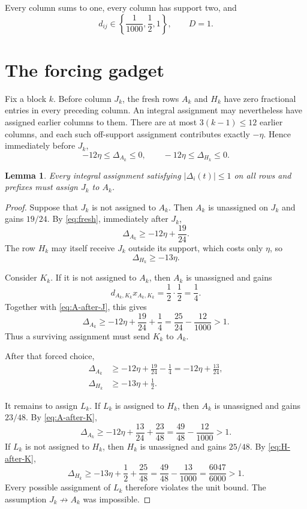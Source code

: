 \documentclass[11pt]{article}
\newtheorem{lemma}[theorem]{Lemma}
\theoremstyle{definition}
\newcommand{\disc}{\Delta}
\begin{document}
Every column sums to one, every column has support two, and
\[
 d_{ij}\in\left\{\frac1{1000},\frac12,1\right\},
 \qquad D=1.
\]

\section{The forcing gadget}

Fix a block $k$.  Before column $J_k$, the fresh rows $A_k$ and $H_k$ have
zero fractional entries in every preceding column.  An integral assignment
may nevertheless have assigned earlier columns to them.  There are at most
$3(k-1)\le12$ earlier columns, and each such off-support assignment contributes
exactly $-\eta$.  Hence immediately before $J_k$,
\begin{equation}\label{eq:fresh}
 -12\eta\le\disc_{A_k}\le0,
 \qquad
 -12\eta\le\disc_{H_k}\le0.
\end{equation}

\begin{lemma}\label{lem:force}
Every integral assignment satisfying $|\disc_i(t)|\le1$ on all rows and
prefixes must assign $J_k$ to $A_k$.
\end{lemma}

\begin{proof}
Suppose that $J_k$ is not assigned to $A_k$.  Then $A_k$ is unassigned on
$J_k$ and gains $19/24$.  By \eqref{eq:fresh}, immediately after $J_k$,
\begin{equation}\label{eq:A-after-J}
 \disc_{A_k}\ge-12\eta+\frac{19}{24}.
\end{equation}
The row $H_k$ may itself receive $J_k$ outside its support, which costs only
$\eta$, so
\begin{equation}\label{eq:H-after-J}
 \disc_{H_k}\ge-13\eta.
\end{equation}

Consider $K_k$.  If it is not assigned to $A_k$, then $A_k$ is unassigned
and gains
\[
 d_{A_k,K_k}x_{A_k,K_k}=\frac12\cdot\frac12=\frac14.
\]
Together with \eqref{eq:A-after-J}, this gives
\[
 \disc_{A_k}\ge-12\eta+\frac{19}{24}+\frac14
 =\frac{25}{24}-\frac{12}{1000}>1.
\]
Thus a surviving assignment must send $K_k$ to $A_k$.

After that forced choice,
\begin{align}
 \disc_{A_k}&\ge-12\eta+\frac{19}{24}-\frac14
             =-12\eta+\frac{13}{24},\label{eq:A-after-K}\\
 \disc_{H_k}&\ge-13\eta+\frac12.\label{eq:H-after-K}
\end{align}

It remains to assign $L_k$.  If $L_k$ is assigned to $H_k$, then $A_k$ is
unassigned and gains $23/48$.  By \eqref{eq:A-after-K},
\[
 \disc_{A_k}\ge-12\eta+\frac{13}{24}+\frac{23}{48}
 =\frac{49}{48}-\frac{12}{1000}>1.
\]
If $L_k$ is not assigned to $H_k$, then $H_k$ is unassigned and gains
$25/48$.  By \eqref{eq:H-after-K},
\[
 \disc_{H_k}\ge-13\eta+\frac12+\frac{25}{48}
 =\frac{49}{48}-\frac{13}{1000}
 =\frac{6047}{6000}>1.
\]
Every possible assignment of $L_k$ therefore violates the unit bound.  The
assumption $J_k\not\to A_k$ was impossible.
\end{proof}
\end{document}
